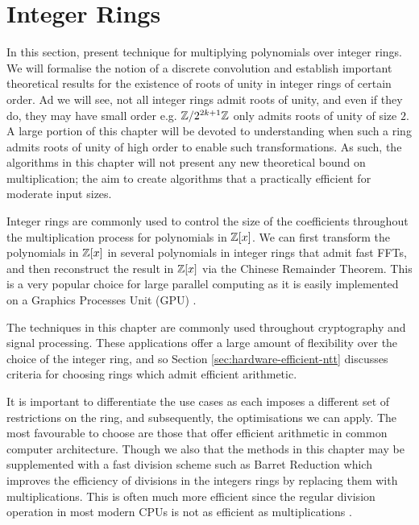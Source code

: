 \chapter{Integer Rings}\label{chp:integer-rings}

In this section, present technique for multiplying polynomials over integer rings. We will formalise the notion of a discrete convolution and establish important theoretical results for the existence of roots of unity in integer rings of certain order. Ad we will see, not all integer rings admit roots of unity, and even if they do, they may have small order e.g. ${\mathbb Z}/2^{2k + 1}{\mathbb Z}$ only admits roots of unity of size $2$. A large portion of this chapter will be devoted to understanding when such a ring admits roots of unity of high order to enable such transformations. As such, the algorithms in this chapter will not present any new theoretical bound on multiplication; the aim to create algorithms that a practically efficient for moderate input sizes.


Integer rings are commonly used to control the size of the coefficients throughout the multiplication process for polynomials in ${\mathbb Z}[x]$. We can first transform the polynomials in ${\mathbb Z}[x]$ in several polynomials in integer rings that admit fast FFTs, and then reconstruct the result in ${\mathbb Z}[x]$ via the Chinese Remainder Theorem. This is a very popular choice for large parallel computing as it is easily implemented on a Graphics Processes Unit (GPU) \cite{gpu-mult} \cite{crt-parallel-mul} \cite{gpu-kepler-architecture}.

The techniques in this chapter are commonly used throughout cryptography and signal processing. These applications offer a large amount of flexibility over the choice of the integer ring, and so Section \ref{sec:hardware-efficient-ntt} discusses criteria for choosing rings which admit efficient arithmetic.

It is important to differentiate the use cases as each imposes a different set of restrictions on the ring, and subsequently, the optimisations we can apply. The most favourable to choose are those that offer efficient arithmetic in common computer architecture. Though we also that the methods in this chapter may be supplemented with a fast division scheme such as Barret Reduction \cite{barret} which improves the efficiency of divisions in the integers rings by replacing them with multiplications. This is often much more efficient since the regular division operation in most modern CPUs is not as efficient as multiplications \cite{instruction-times}.

